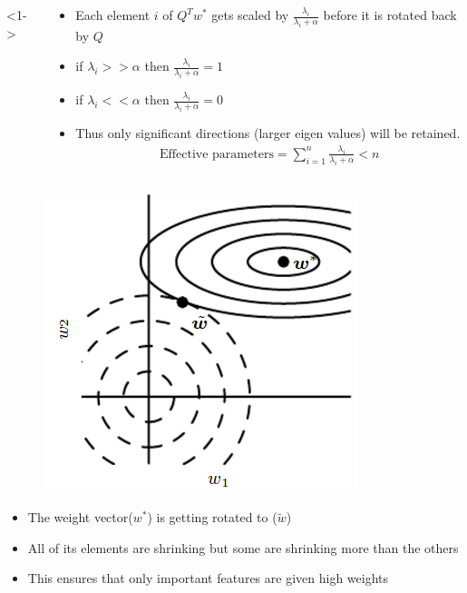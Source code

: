 \begin{frame}
\begin{columns}
		<1->
		\vspace{3em}
		\begin{overlayarea}{\textwidth}{\textheight}
			\begin{itemize}
				\item <1->  Each element $i$ of $Q^T w^*$ gets scaled by $\frac{\lambda_i}{\lambda_i + \alpha} $ before it is rotated back by $Q$
				\item <2->  if $\lambda_i >> \alpha$ then $\frac{\lambda_i}{\lambda_i + \alpha} = 1$
				\item <3->  if $\lambda_i << \alpha$ then $\frac{\lambda_i}{\lambda_i + \alpha} = 0$
				\item <4->  Thus only significant directions (larger eigen values) will  be retained.  
				\begin{align*}
					\text{Effective parameters} = \sum_{i=1}^{n} \frac{\lambda_i}{\lambda_i+\alpha} < n
				\end{align*}
			\end{itemize}
		\end{overlayarea}
	\end{columns}
\end{frame}

\begin{frame}
			
	\begin{figure}
		\centering
		\includegraphics[width=0.35\linewidth]{./images/7_1DL}
		\caption*{}
		\label{fig:7_1DL}
	\end{figure}
	
	\begin{itemize}
		\item<2-> The weight vector($w^*$) is getting rotated to ($\tilde{w}$)
		\item<3-> All of its elements are shrinking but some are shrinking more than the others
		\item<4-> This ensures that only important features are given high weights
	\end{itemize}
\end{frame}
